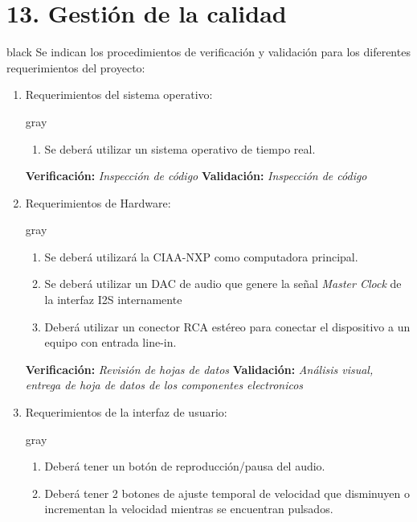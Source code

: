 \documentclass[11pt]{charter}
\begin{document}
\section{13. Gestión de la calidad}
\label{sec:calidad}

\begin{consigna}{black}
Se indican los procedimientos de verificación y validación para los diferentes requerimientos del proyecto:
\begin{enumerate}
\item Requerimientos del sistema operativo:
	\begin{consigna}{gray}
	\begin{enumerate}
	\item  Se deberá utilizar un sistema operativo de tiempo real.
	\end{enumerate}
	\end{consigna}
	\textbf{Verificación:} \textit{Inspección de código} \newline                                                                              
	\newline 
	\textbf{Validación:} \textit{Inspección de código}
\item Requerimientos de Hardware:
	\begin{consigna}{gray}
	\begin{enumerate}
	\item Se deberá utilizará la CIAA-NXP como computadora principal.
	\item Se deberá utilizar un DAC de audio  que genere la señal \textit{Master Clock} de la interfaz I2S internamente 
	\item Deberá utilizar un conector RCA estéreo para conectar el dispositivo a un equipo con entrada  line-in.
	\end{enumerate}
	\end{consigna}
	\textbf{Verificación:} \textit{Revisión de hojas de datos} \newline                                                                              
	\newline 
	\textbf{Validación:} \textit{Análisis visual, entrega de hoja de datos de los componentes electronicos}
\item Requerimientos de la interfaz de usuario:
	\begin{consigna}{gray}
	\begin{enumerate}
	\item Deberá tener un botón de reproducción/pausa del audio.
	\item Deberá tener 2 botones de ajuste temporal de velocidad que disminuyen o incrementan la velocidad mientras se encuentran pulsados.

\end{enumerate}
\end{consigna}
\end{enumerate}
\end{consigna}
\end{document}
